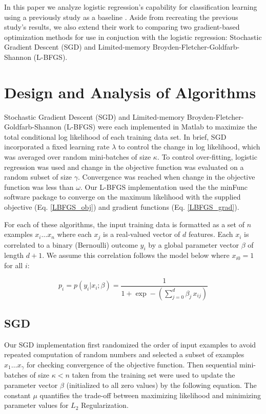 \documentclass[10pt]{article}
\begin{document}
In this paper we analyze logistic regression's capability for classification learning using a previously study as a baseline \cite{t-logistic}. Aside from recreating the previous study's results, we also extend their work to comparing two gradient-based optimization methods for use in conjuction with the logistic regression: Stochastic Gradient Descent (SGD) and Limited-memory Broyden-Fletcher-Goldfarb-Shannon (L-BFGS).



\section{Design and Analysis of Algorithms}
\label{sec:algorithms}

Stochastic Gradient Descent (SGD) and Limited-memory Broyden-Fletcher-Goldfarb-Shannon (L-BFGS) were each implemented in Matlab to maximize the total conditional log likelihood of each training data set. In brief, SGD incorporated a fixed learning rate $\lambda$ to control the change in log likelihood, which was averaged over random mini-batches of size $\kappa$. To control over-fitting, logistic regression was used and change in the objective function was evaluated on a random subset of size $\gamma$. Convergence was reached when change in the objective function was less than $\omega$. Our L-BFGS implementation used the the minFunc \cite{minFunc} software package to converge on the maximum likelihood with the supplied objective (Eq. \ref{LBFGS_obj}) and gradient functions (Eq. \ref{LBFGS_grad}).

For each of these algorithms, the input training data is formatted as a set of $n$ examples $x_i \ldots x_n$ where each $x_j$ is a real-valued vector of $d$ features. Each $x_i$ is correlated to a binary (Bernoulli) outcome $y_i$ by a global parameter vector $\beta$ of length $d+1$. We assume this correlation follows the model below where $x_{i0}=1$ for all $i$:

\begin{equation}\label{p}
    p_i = p(y_i|x_i;\beta) = \frac{1}{1+\exp-(\sum_{j=0}^{d} \beta_j\,x_{ij})}
\end{equation}



\subsection{SGD} 
Our SGD implementation first randomized the order of input examples to avoid repeated computation of random numbers and selected a subset of examples $x_1 \ldots x_{\gamma}$ for checking convergence of the objective function. Then sequential mini-batches of size $\kappa < n$ taken from the training set were used to update the parameter vector $\beta$ (initialized to all zero values) by the following equation. The constant $\mu$ quantifies the trade-off between maximizing likelihood and minimizing parameter values for $L_2$ Regularization.
\end{document}
